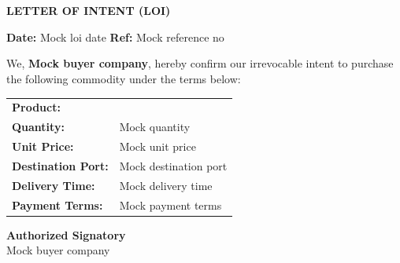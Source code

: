 \documentclass[11pt]{article}
\begin{document}
\begin{center}
{\LARGE \textbf{}}\\[2pt]
{\small }\mbox{}\mbox{}\\[10pt]
{\Large \textbf{LETTER OF INTENT (LOI)}}
\end{center}

\vspace{1em}
\noindent \textbf{Date:} Mock loi date \hfill \textbf{Ref:} Mock reference no

\vspace{1em}
\noindent We, \textbf{Mock buyer company}, hereby confirm our irrevocable intent to
purchase the following commodity under the terms below:

\vspace{1em}
\begin{tabular}{ll}
\textbf{Product:} & \mbox{}\\
\textbf{Quantity:} & Mock quantity \mbox{}\\
\textbf{Unit Price:} & Mock unit price\mbox{}\\
\textbf{Destination Port:} & Mock destination port\mbox{}\\
\textbf{Delivery Time:} & Mock delivery time\mbox{}\\
\textbf{Payment Terms:} & Mock payment terms\mbox{}\\
\end{tabular}

\vspace{2em}
\noindent \textbf{Authorized Signatory}\mbox{}\\
Mock buyer company

\vspace{3em}
\end{document}
